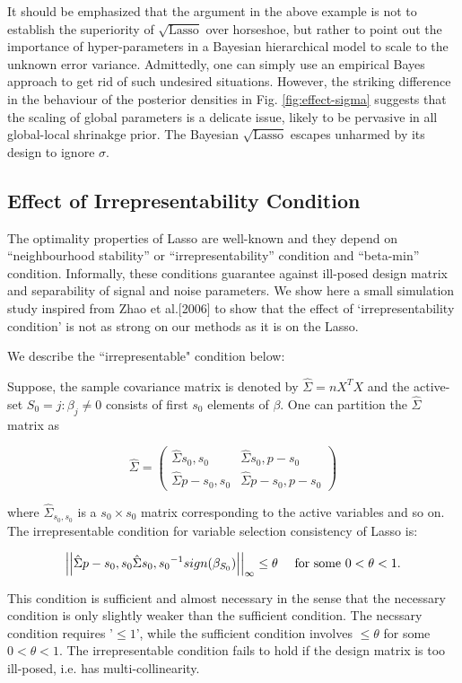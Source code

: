 \documentclass[10pt]{article}
\def\sql{$\sqrt{\text{Lasso}}$}
\begin{document}
It should be emphasized that the argument in the above example is not to establish the superiority of \sql{} over horseshoe, but rather to point out the importance of hyper-parameters in a Bayesian hierarchical model to scale to the unknown error variance. Admittedly, one can simply use an empirical Bayes approach to get rid of such undesired situations. However, the striking difference in the behaviour of the posterior densities in Fig. \ref{fig:effect-sigma} suggests that the scaling of global parameters is a delicate issue, likely to be pervasive in all global-local shrinakge prior. The Bayesian \sql{} escapes unharmed by its design to ignore $\sigma$. 

\subsection{Effect of Irrepresentability Condition}

The optimality properties of Lasso are well-known and they depend on ``neighbourhood stability'' or ``irrepresentability'' condition and ``beta-min'' condition. Informally, these conditions guarantee against ill-posed design matrix and separability of signal and noise parameters. We show here a small simulation study inspired from Zhao et al.[2006] to show that the effect of `irrepresentability condition' is not as strong on our methods as it is on the Lasso.


We describe the ``irrepresentable" condition below:\par Suppose, the sample covariance matrix is denoted by $\hat{\Sigma} = nX^T X$ and the active-set $S_0 = { j : \beta_j \neq 0}$ consists of first $s_0$ elements of $\beta$. One can partition the $\hat{\Sigma}$ matrix as

$$ \hat{\Sigma} = \left(\begin{array}{cc}
\hat{\Sigma}{s_0,s_0} & \hat{\Sigma}{s_0,p-s_0} \\ \hat{\Sigma}{p-s_0,s_0} & \hat{\Sigma}{p-s_0,p-s_0} \end{array} \right) $$

where $\hat{\Sigma}_{s_0,s_0}$ is a $s_0\times s_0$ matrix corresponding to the active variables and so on. The irrepresentable condition for variable selection consistency of Lasso is:

$$ \left|\left|\hat{\Sigma}{p-s_0,s_0} \hat{\Sigma}{s_0,s_0}^{-1} sign(\beta_{S_0})\right|\right|_{\infty} \leq \theta \quad \mbox{ for some } 0 < \theta < 1 .$$

This condition is sufficient and almost necessary in the sense that the necessary condition is only slightly weaker than the sufficient condition. The necssary condition requires '$\leq 1$', while the sufficient condition involves $\leq \theta$ for some $0 < \theta < 1$. The irrepresentable condition fails to hold if the design matrix is too ill-posed, i.e. has multi-collinearity.
\end{document}
